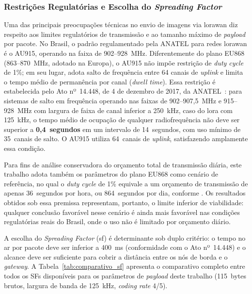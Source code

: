 \subsubsection{Restrições Regulatórias e Escolha do \textit{Spreading Factor}}
 
Uma das principais preocupações técnicas no envio de imagens via \gls{lorawan} diz
respeito aos limites regulatórios de transmissão e ao tamanho máximo de \textit{\gls{payload}}
por pacote. No Brasil, o padrão regulamentado pela ANATEL para redes \gls{lorawan} é o
AU915, operando na faixa de 902--928~MHz. Diferentemente do plano EU868 (863--870~MHz,
adotado na Europa), o AU915 não impõe restrição de \textit{duty cycle} de 1\%; em seu lugar,
adota salto de frequência entre 64 canais de \textit{uplink} e limita o tempo médio de
permanência por canal (\textit{dwell time}). Essa restrição é estabelecida pelo Ato
nº~14.448, de 4 de dezembro de 2017, da ANATEL~\cite{anatel2017}: para sistemas de
salto em frequência operando nas faixas de 902--907,5~MHz e 915--928~MHz com largura
de faixa de canal inferior a 250~kHz, caso do \gls{lora} com 125~kHz, o tempo médio
de ocupação de qualquer radiofrequência não deve ser superior a \textbf{0,4~segundos}
em um intervalo de 14~segundos, com uso mínimo de 35~canais de salto. O AU915
utiliza 64~canais de \textit{uplink}, satisfazendo amplamente essa condição.
 
Para fins de análise conservadora do orçamento total de transmissão diária, este
trabalho adota também os parâmetros do plano EU868 como cenário de referência, no
qual o \textit{duty cycle} de 1\% equivale a um orçamento de transmissão de apenas
36~segundos por hora, ou 864~segundos por dia, conforme . Os
resultados obtidos sob essa premissa representam, portanto, o limite inferior de
viabilidade: qualquer conclusão favorável nesse cenário é ainda mais favorável nas
condições regulatórias reais do Brasil, onde o uso não é limitado por orçamento diário.
 
A escolha do \textit{Spreading Factor} (\gls{sf}) é determinante sob duplo critério: o tempo
no ar por pacote deve ser inferior a 400~ms (conformidade com o Ato nº~14.448) e o
alcance deve ser suficiente para cobrir a distância entre os nós de borda e o
\textit{gateway}. A Tabela~\ref{tab:comparativo_sf} apresenta o comparativo completo
entre todos os SFs disponíveis para os parâmetros de \textit{\gls{payload}} deste trabalho
(115~bytes brutos, largura de banda de 125~kHz, \textit{coding rate} 4/5).
 
